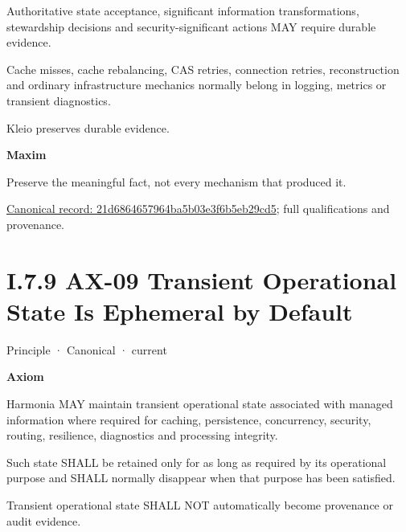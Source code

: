 Authoritative state acceptance, significant information transformations,
stewardship decisions and security-significant actions MAY require
durable evidence.



Cache misses, cache rebalancing, CAS retries, connection retries,
reconstruction and ordinary infrastructure mechanics normally belong in
logging, metrics or transient diagnostics.



Kleio preserves durable evidence.



\par\medskip\textbf{Maxim}\par


Preserve the meaningful fact, not every mechanism that produced it.


{\footnotesize \href{../../../../continuum/motivation/principle/21d6864657964ba5b03e3f6b5eb29cd5.md}{Canonical record: 21d6864657964ba5b03e3f6b5eb29cd5}; full qualifications and provenance.}\par
\section*{I.7.9 AX-09 Transient Operational State Is Ephemeral by Default}
\label{navigation:I.7.9}

\label{element:9a5cb9e8876844e58e660f909f7df9fc}
{\small Principle · Canonical · current}\par

\par\medskip\textbf{Axiom}\par


Harmonia MAY maintain transient operational state associated with
managed information where required for caching, persistence,
concurrency, security, routing, resilience, diagnostics and processing
integrity.



Such state SHALL be retained only for as long as required by its
operational purpose and SHALL normally disappear when that purpose has
been satisfied.



Transient operational state SHALL NOT automatically become provenance or
audit evidence.



